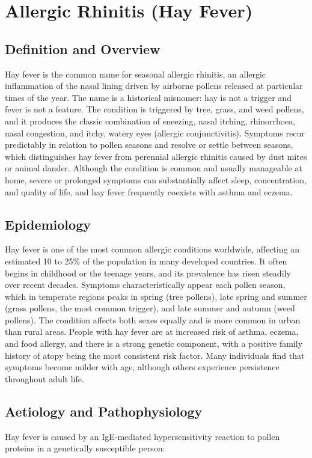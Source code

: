 \chapter{Allergic Rhinitis (Hay Fever)}

\section*{Definition and Overview}
Hay fever is the common name for seasonal allergic rhinitis, an allergic inflammation of the nasal lining driven by airborne pollens released at particular times of the year. The name is a historical misnomer: hay is not a trigger and fever is not a feature. The condition is triggered by tree, grass, and weed pollens, and it produces the classic combination of sneezing, nasal itching, rhinorrhoea, nasal congestion, and itchy, watery eyes (allergic conjunctivitis). Symptoms recur predictably in relation to pollen seasons and resolve or settle between seasons, which distinguishes hay fever from perennial allergic rhinitis caused by dust mites or animal dander. Although the condition is common and usually manageable at home, severe or prolonged symptoms can substantially affect sleep, concentration, and quality of life, and hay fever frequently coexists with asthma and eczema.

\section*{Epidemiology}
Hay fever is one of the most common allergic conditions worldwide, affecting an estimated 10 to 25\% of the population in many developed countries. It often begins in childhood or the teenage years, and its prevalence has risen steadily over recent decades. Symptoms characteristically appear each pollen season, which in temperate regions peaks in spring (tree pollens), late spring and summer (grass pollens, the most common trigger), and late summer and autumn (weed pollens). The condition affects both sexes equally and is more common in urban than rural areas. People with hay fever are at increased risk of asthma, eczema, and food allergy, and there is a strong genetic component, with a positive family history of atopy being the most consistent risk factor. Many individuals find that symptoms become milder with age, although others experience persistence throughout adult life.

\section*{Aetiology and Pathophysiology}
Hay fever is caused by an IgE-mediated hypersensitivity reaction to pollen proteins in a genetically susceptible person:

